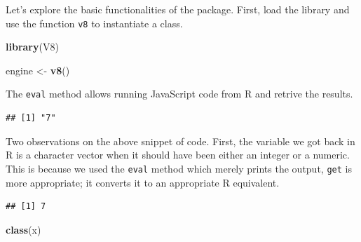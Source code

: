 \documentclass[
]{krantz}
\makeatletter
\newenvironment{Shaded}{\begin{snugshade}}{\end{snugshade}}
\newcommand{\CommentTok}[1]{\textcolor[rgb]{0.37,0.37,0.37}{\textit{#1}}}
\newcommand{\KeywordTok}[1]{\textcolor[rgb]{0.27,0.27,0.27}{\textbf{#1}}}
\newcommand{\NormalTok}[1]{#1}
\newcommand{\OperatorTok}[1]{\textcolor[rgb]{0.43,0.43,0.43}{\textbf{#1}}}
\newcommand{\StringTok}[1]{\textcolor[rgb]{0.5,0.5,0.5}{#1}}
\newenvironment{kframe}{%
\medskip{}
\setlength{\fboxsep}{.8em}
 \def\at@end@of@kframe{}%
 \ifinner\ifhmode%
  \def\at@end@of@kframe{\end{minipage}}%
  \begin{minipage}{\columnwidth}%
 \fi\fi%
 \def\FrameCommand##1{\hskip\@totalleftmargin \hskip-\fboxsep
 \colorbox{shadecolor}{##1}\hskip-\fboxsep
     \hskip-\linewidth \hskip-\@totalleftmargin \hskip\columnwidth}%
 \MakeFramed {\advance\hsize-\width
   \@totalleftmargin\z@ \linewidth\hsize
   \@setminipage}}%
 {\par\unskip\endMakeFramed%
 \at@end@of@kframe}
\renewenvironment{Shaded}{\begin{kframe}}{\end{kframe}}
\makeatother
\begin{document}
Let's explore the basic functionalities of the package. First, load the library and use the function \texttt{v8} to instantiate a class.

\begin{Shaded}
\begin{Highlighting}[]
\KeywordTok{library}\NormalTok{(V8)}

\NormalTok{engine <{-}}\StringTok{ }\KeywordTok{v8}\NormalTok{()}
\end{Highlighting}
\end{Shaded}

The \texttt{eval} method allows running JavaScript code from R and retrive the results.

\begin{Shaded}
\end{Shaded}

\begin{verbatim}
## [1] "7"
\end{verbatim}

Two observations on the above snippet of code. First, the variable we got back in R is a character vector when it should have been either an integer or a numeric. This is because we used the \texttt{eval} method which merely prints the output, \texttt{get} is more appropriate; it converts it to an appropriate R equivalent.

\begin{Shaded}
\end{Shaded}

\begin{verbatim}
## [1] 7
\end{verbatim}

\begin{Shaded}
\begin{Highlighting}[]
\KeywordTok{class}\NormalTok{(x)}
\end{Highlighting}
\end{Shaded}
\end{document}

